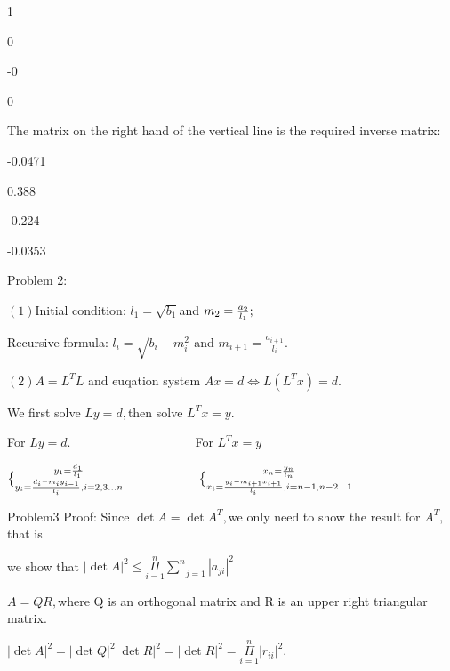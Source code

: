 \documentclass{article}
\begin{document}
1\qquad \TEXTsymbol{\vert}\qquad

0\qquad \TEXTsymbol{\vert}\qquad

-0\qquad \TEXTsymbol{\vert}\qquad

0\qquad \TEXTsymbol{\vert}\qquad

The matrix on the right hand of the vertical line is the required inverse
matrix:

-0.0471\qquad

0.388\qquad

-0.224\qquad

-0.0353\qquad

Problem 2:

$\left( 1\right) $Initial condition: $l_{1}=\sqrt{b_{1}}$and $m_{2}=\frac{%
a_{2}}{l_{1}};$

Recursive formula: $l_{i}=\sqrt{b_{i}-m_{i}^{2}}$ and $m_{i+1}=\frac{a_{i+1}%
}{l_{i}}.$

$\left( 2\right) A=L^{T}L$ and euqation system $Ax=d\iff L\left(
L^{T}x\right) =d.$

We first solve $Ly=d,$then solve $L^{T}x=y.$

For $Ly=d.\qquad \qquad \qquad \qquad \qquad $For $L^{T}x=y$

$\bigskip \QATOPD\{ . {y_{1}=\frac{d_{1}}{l_{1}}}{y_{i}=\frac{%
d_{i}-m_{i}y_{i-1}}{l_{i}},i=2,3...n}\qquad \qquad \qquad \QATOPD\{ . {x_{n}=%
\frac{y_{n}}{l_{n}}}{x_{i}=\frac{y_{i}-m_{i+1}x_{i+1}}{l_{i}},i=n-1,n-2...1}$


Problem3 Proof: Since $\det A=\det A^{T},$we only need to show the result
for $A^{T},$that is

we show that $\left\vert \det A\right\vert ^{2}\leq \underset{i=1}{\overset{n%
}{\Pi }}\underset{j=1}{\overset{n}{\sum }}\left\vert a_{ji}\right\vert ^{2}$

$A=QR,$where Q is an orthogonal matrix and R is an upper right triangular
matrix.

$\left\vert \det A\right\vert ^{2}=\left\vert \det Q\right\vert
^{2}\left\vert \det R\right\vert ^{2}=\left\vert \det R\right\vert ^{2}=%
\underset{i=1}{\overset{n}{\Pi }}\left\vert r_{ii}\right\vert ^{2}.$
\end{document}
